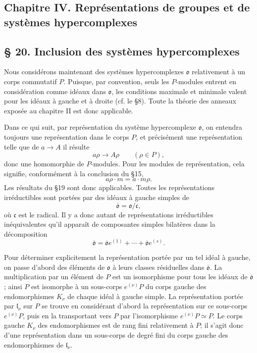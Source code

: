 
\providecommand{\mo}{\mathfrak{o}}
\providecommand{\mc}{\mathfrak{c}}
\providecommand{\ma}{\mathfrak{a}}
\providecommand{\ml}{\mathfrak{l}}

\subsection*{Chapitre IV. Représentations de groupes et de systèmes hypercomplexes}

\subsection*{\S{} 20. Inclusion des systèmes hypercomplexes}
Nous considérons maintenant des systèmes hypercomplexes $\mo$ relativement à un corps commutatif $P$. Puisque, par convention, seuls les $P$-modules entrent en considération comme idéaux dans $\mo$, les conditions maximale et minimale valent pour les idéaux à gauche et à droite (cf. le \S{}8). Toute la théorie des anneaux exposée au chapitre II est donc applicable.

Dans ce qui suit, par représentation du système hypercomplexe $\mo$, on entendra toujours une représentation dans le corps $P$, et précisément une représentation telle que de $a\to A$ il résulte
\[
        a\rho\to A\rho\qquad(\rho\in P),
\]
donc une homomorphie de $P$-modules. Pour les modules de représentation, cela signifie, conformément à la conclusion du \S{}15,
\[
        a\rho\cdot m=a\cdot m\rho.
\]
Les résultats du \S{}19 sont donc applicables. Toutes les représentations irréductibles sont portées par des idéaux à gauche simples de
\[
        \overline{\mo}=\mo/\mc,
\]
où $\mc$ est le radical. Il y a donc autant de représentations irréductibles inéquivalentes qu'il apparaît de composantes simples bilatères dans la décomposition
\[
        \overline{\mo}
        =\overline{\mo}e^{(1)}+\cdots+\overline{\mo}e^{(s)}.
\]

Pour déterminer explicitement la représentation portée par un tel idéal à gauche, on passe d'abord des éléments de $\mo$ à leurs classes résiduelles dans $\overline{\mo}$. La multiplication par un élément de $P$ est un isomorphisme pour tous les idéaux de $\overline{\mo}$; ainsi $P$ est isomorphe à un sous-corps $e^{(\nu)}P$ du corps gauche des endomorphismes $K_\nu$ de chaque idéal à gauche simple. La représentation portée par $\ml_\nu$ sur $P$ se trouve en considérant d'abord la représentation sur ce sous-corps $e^{(\nu)}P$, puis en la transportant vers $P$ par l'isomorphisme $e^{(\nu)}P\simeq P$. Le corps gauche $K_\nu$ des endomorphismes est de rang fini relativement à $P$; il s'agit donc d'une représentation dans un sous-corps de degré fini du corps gauche des endomorphismes de $\ml_\nu$.


